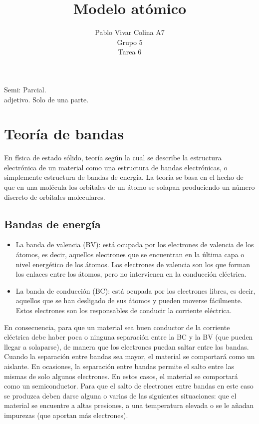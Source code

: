 \documentclass{article}
\title{Modelo atómico}
\author{Pablo Vivar Colina A7\\
Grupo 5\\
Tarea 6
}
\begin{document}
\maketitle

Semi: Parcial.\\
adjetivo. Solo de una parte.\citep{Parc}\\

\section{Teoría de bandas}

En física de estado sólido, teoría según la cual se describe la estructura electrónica de un material como una estructura de bandas electrónicas, o simplemente estructura de bandas de energía. La teoría se basa en el hecho de que en una molécula los orbitales de un átomo se solapan produciendo un número discreto de orbitales moleculares.\citep{TeorB}\\

 \subsection{Bandas de energía}
 
 \begin{itemize}
    
     \item La banda de valencia (BV): está ocupada por los electrones de valencia de los átomos, es decir, aquellos electrones que se encuentran en la última capa o nivel energético de los átomos. Los electrones de valencia son los que forman los enlaces entre los átomos, pero no intervienen en la conducción eléctrica.
     \citep{TeorB}
     \item  La banda de conducción (BC): está ocupada por los electrones libres, es decir, aquellos que se han desligado de sus átomos y pueden moverse fácilmente. Estos electrones son los responsables de conducir la corriente eléctrica.
     \citep{TeorB}

 \end{itemize}
 
 En consecuencia, para que un material sea buen conductor de la corriente eléctrica debe haber poca o ninguna separación entre la BC y la BV (que pueden llegar a solaparse), de manera que los electrones puedan saltar entre las bandas. Cuando la separación entre bandas sea mayor, el material se comportará como un aislante. En ocasiones, la separación entre bandas permite el salto entre las mismas de solo algunos electrones. En estos casos, el material se comportará como un semiconductor. Para que el salto de electrones entre bandas en este caso se produzca deben darse alguna o varias de las siguientes situaciones: que el material se encuentre a altas presiones, a una temperatura elevada o se le añadan impurezas (que aportan más electrones).\citep{TeorB}
\end{document}

